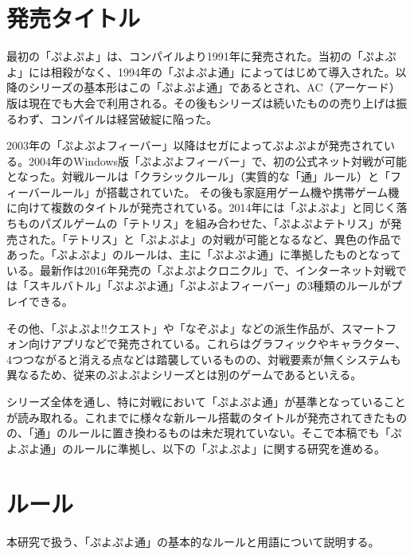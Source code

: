 \documentclass[12pt]{jreport}
\begin{document}
\section{発売タイトル}
最初の「ぷよぷよ」は、コンパイルより1991年に発売された。当初の「ぷよぷよ」には相殺がなく、1994年の「ぷよぷよ通」によってはじめて導入された。以降のシリーズの基本形はこの「ぷよぷよ通」であるとされ、AC（アーケード）版は現在でも大会で利用される。その後もシリーズは続いたものの売り上げは振るわず、コンパイルは経営破綻に陥った。

2003年の「ぷよぷよフィーバー」以降はセガによってぷよぷよが発売されている。2004年のWindows版「ぷよぷよフィーバー」で、初の公式ネット対戦が可能となった。対戦ルールは「クラシックルール」（実質的な「通」ルール）と「フィーバールール」が搭載されていた。
その後も家庭用ゲーム機や携帯ゲーム機に向けて複数のタイトルが発売されている。2014年には「ぷよぷよ」と同じく落ちものパズルゲームの「テトリス」を組み合わせた、「ぷよぷよテトリス」が発売された。「テトリス」と「ぷよぷよ」の対戦が可能となるなど、異色の作品であった。「ぷよぷよ」のルールは、主に「ぷよぷよ通」に準拠したものとなっている。最新作は2016年発売の「ぷよぷよクロニクル」で、インターネット対戦では「スキルバトル」「ぷよぷよ通」「ぷよぷよフィーバー」の3種類のルールがプレイできる。

その他、「ぷよぷよ!!クエスト」や「なぞぷよ」などの派生作品が、スマートフォン向けアプリなどで発売されている。これらはグラフィックやキャラクター、4つつながると消える点などは踏襲しているものの、対戦要素が無くシステムも異なるため、従来のぷよぷよシリーズとは別のゲームであるといえる。

シリーズ全体を通し、特に対戦において「ぷよぷよ通」が基準となっていることが読み取れる。これまでに様々な新ルール搭載のタイトルが発売されてきたものの、「通」のルールに置き換わるものは未だ現れていない。そこで本稿でも「ぷよぷよ通」のルールに準拠し、以下の「ぷよぷよ」に関する研究を進める。

\section{ルール} \label{rule}
本研究で扱う、「ぷよぷよ通」の基本的なルールと用語について説明する。

\end{document}

